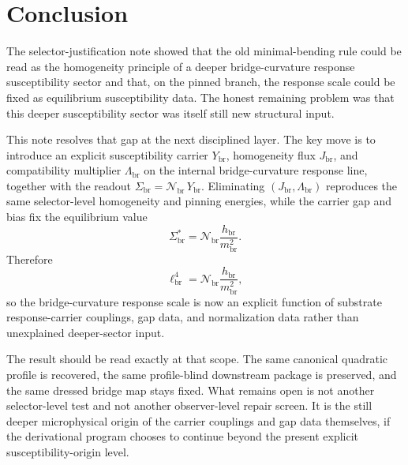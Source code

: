 \documentclass[11pt]{article}
\newcommand{\CurvScale}{\ell_{\mathrm{br}}}
\newcommand{\RespSus}{\Sigma_{\mathrm{br}}}
\newcommand{\RespSusEq}{\Sigma_{\mathrm{br}}^{\ast}}
\newcommand{\RespCarrier}{Y_{\mathrm{br}}}
\newcommand{\RespFlux}{J_{\mathrm{br}}}
\newcommand{\RespCompat}{\Lambda_{\mathrm{br}}}
\newcommand{\RespNorm}{\mathcal N_{\mathrm{br}}}
\newcommand{\RespGap}{m_{\mathrm{br}}}
\newcommand{\RespBias}{h_{\mathrm{br}}}
\begin{document}
\section{Conclusion}

The selector-justification note showed that the old minimal-bending rule could be read as the homogeneity principle of a deeper bridge-curvature response susceptibility sector and that, on the pinned branch, the response scale could be fixed as equilibrium susceptibility data. The honest remaining problem was that this deeper susceptibility sector was itself still new structural input.

This note resolves that gap at the next disciplined layer. The key move is to introduce an explicit susceptibility carrier \(\RespCarrier\), homogeneity flux \(\RespFlux\), and compatibility multiplier \(\RespCompat\) on the internal bridge-curvature response line, together with the readout \(\RespSus=\RespNorm\,\RespCarrier\). Eliminating \((\RespFlux,\RespCompat)\) reproduces the same selector-level homogeneity and pinning energies, while the carrier gap and bias fix the equilibrium value
\[
\RespSusEq=\RespNorm\frac{\RespBias}{\RespGap^2}.
\]
Therefore
\[
\CurvScale^4=\RespNorm\frac{\RespBias}{\RespGap^2},
\]
so the bridge-curvature response scale is now an explicit function of substrate response-carrier couplings, gap data, and normalization data rather than unexplained deeper-sector input.

The result should be read exactly at that scope. The same canonical quadratic profile is recovered, the same profile-blind downstream package is preserved, and the same dressed bridge map stays fixed. What remains open is not another selector-level test and not another observer-level repair screen. It is the still deeper microphysical origin of the carrier couplings and gap data themselves, if the derivational program chooses to continue beyond the present explicit susceptibility-origin level.
\end{document}
